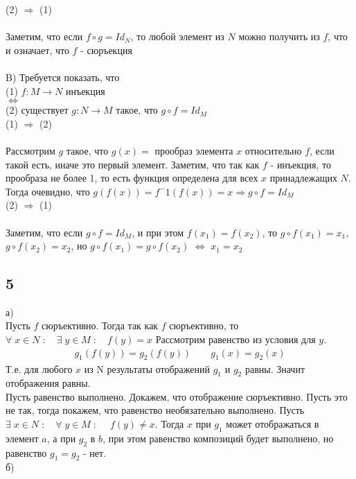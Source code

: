 		(2) $\Longrightarrow$ (1) \\ \\
		Заметим, что если $f \circ g = Id_N$, то любой элемент из $N$ можно получить из $f$, что и означает, что $f$ - сюръекция\\ \\
		B)		
		Требуется показать, что \\
		(1) $f: M \longrightarrow N$ инъекция \\
		$\Longleftrightarrow$ \\
		(2) существует $g: N \longrightarrow M$ такое, что $g \circ f = Id_M$ \\
		
		
		(1) $\Longrightarrow$ (2) \\ \\		
		Рассмотрим $g$ такое, что $g(x) = $ прообраз элемента $x$ относительно $f$, если такой есть, иначе это первый элемент. Заметим, что так как $f$ - инъекция, то прообраза не более 1, то есть функция определена для всех $x$ принадлежащих $N$. Тогда очевидно, что $g(f(x)) = f^-1(f(x)) = x \Longrightarrow g \circ f = Id_M$ \\
		
		(2) $\Longrightarrow$ (1) \\ \\ 	
		Заметим, что если $g \circ f = Id_M$, и при этом $f(x_1)=f(x_2)$, то $g \circ f(x_1) = x_1$, $g \circ f(x_2) = x_2$, но $g \circ f(x_1) = g \circ f(x_2)$ $\Longleftrightarrow$ $x_1 = x_2$
		
		\subsection{5}
		 а)\\
		Пусть $f$ сюръективно. Тогда так как $f$ сюръективно, то $ \forall \; x \in N \;: \quad \exists \; y \in M \;: \quad f(y)=x$ Рассмотрим равенство из условия для $y$.\\
		\begin{gather*}
		g_1(f(y))=g_2(f(y)) \qquad g_1(x)=g_2(x) 
		\end{gather*}
		Т.е. для любого $x$ из N результаты отображений $g_1$ и $g_2$ равны. Значит отображения равны.\\
		Пусть равенство выполнено. Докажем, что отображение сюръективно. Пусть это не так, тогда покажем, что равенство необязательно выполнено. Пусть $\exists \; x \in N \;:\quad \forall \; y \in M \;:\quad \; f(y)\ne x$. Тогда $x$ при $g_1$ может отображаться в элемент $a$, а при $g_2$ в $b$, при этом равенство композиций будет выполнено, но равенство $g_1=g_2$ - нет.\\
		б)\\
		
